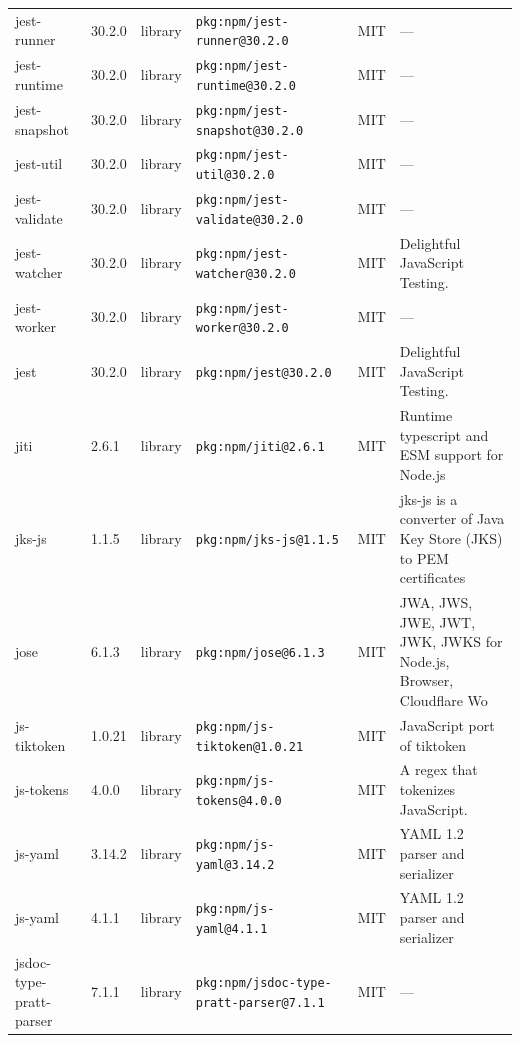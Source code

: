 \documentclass[11pt,a4paper]{article}
\begin{document}
\begin{longtable}{|p{4cm}|p{2cm}|p{1.6cm}|p{5cm}|p{1.5cm}|p{3.5cm}|}
\raggedright jest-runner & 30.2.0 & library & \small\texttt{pkg:npm/jest-runner@30.2.0} & MIT & \small — \\
\raggedright jest-runtime & 30.2.0 & library & \small\texttt{pkg:npm/jest-runtime@30.2.0} & MIT & \small — \\
\raggedright jest-snapshot & 30.2.0 & library & \small\texttt{pkg:npm/jest-snapshot@30.2.0} & MIT & \small — \\
\raggedright jest-util & 30.2.0 & library & \small\texttt{pkg:npm/jest-util@30.2.0} & MIT & \small — \\
\raggedright jest-validate & 30.2.0 & library & \small\texttt{pkg:npm/jest-validate@30.2.0} & MIT & \small — \\
\raggedright jest-watcher & 30.2.0 & library & \small\texttt{pkg:npm/jest-watcher@30.2.0} & MIT & \small Delightful JavaScript Testing. \\
\raggedright jest-worker & 30.2.0 & library & \small\texttt{pkg:npm/jest-worker@30.2.0} & MIT & \small — \\
\raggedright jest & 30.2.0 & library & \small\texttt{pkg:npm/jest@30.2.0} & MIT & \small Delightful JavaScript Testing. \\
\raggedright jiti & 2.6.1 & library & \small\texttt{pkg:npm/jiti@2.6.1} & MIT & \small Runtime typescript and ESM support for Node.js \\
\raggedright jks-js & 1.1.5 & library & \small\texttt{pkg:npm/jks-js@1.1.5} & MIT & \small jks-js is a converter of Java Key Store (JKS) to PEM certificates \\
\raggedright jose & 6.1.3 & library & \small\texttt{pkg:npm/jose@6.1.3} & MIT & \small JWA, JWS, JWE, JWT, JWK, JWKS for Node.js, Browser, Cloudflare Wo \\
\raggedright js-tiktoken & 1.0.21 & library & \small\texttt{pkg:npm/js-tiktoken@1.0.21} & MIT & \small JavaScript port of tiktoken \\
\raggedright js-tokens & 4.0.0 & library & \small\texttt{pkg:npm/js-tokens@4.0.0} & MIT & \small A regex that tokenizes JavaScript. \\
\raggedright js-yaml & 3.14.2 & library & \small\texttt{pkg:npm/js-yaml@3.14.2} & MIT & \small YAML 1.2 parser and serializer \\
\raggedright js-yaml & 4.1.1 & library & \small\texttt{pkg:npm/js-yaml@4.1.1} & MIT & \small YAML 1.2 parser and serializer \\
\raggedright jsdoc-type-pratt-parser & 7.1.1 & library & \small\texttt{pkg:npm/jsdoc-type-pratt-parser@7.1.1} & MIT & \small — \\

\end{longtable}
\end{document}
